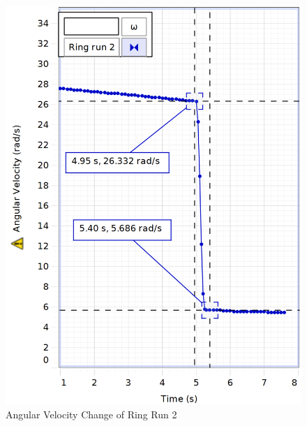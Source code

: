 \begin{figure}[H]
  \centering\includegraphics[width=15cm]{figRingRun2.png}
  \caption{Angular Velocity Change of Ring Run 2}
  \label{fig:RingRun2}
\end{figure}\begin{figure}[H]

\end{figure}
